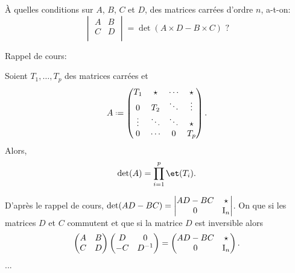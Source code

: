 \begin{exercice} 
À quelles conditions sur $A$, $B$, $C$ et $D$, des matrices carrées d'ordre $n$, a-t-on:
    $$
        \begin{vmatrix}
            A & B\\
            C & D\\
        \end{vmatrix} = \det(A \times D - B \times C) \text{ ?}
    $$ 
\end{exercice}
 
Rappel de cours:

\begin{prop}{}
    Soient $T_1, \dots, T_p$ des matrices carrées et 
    $$A \defeq
    \begin{pmatrix}
        T_1 & \star & \cdots & \star \\
        0 & T_2 & \ddots & \vdots \\
        \vdots & \ddots & \ddots & \star \\
        0 & \cdots & 0 & T_p
    \end{pmatrix}.
    $$
    Alors, 
    $$\det(A) = \prod_{i=1}^p \et(T_i).$$
\end{prop}

\begin{solution}
    D'après le rappel de cours, $\det(AD - BC) = \begin{vmatrix}
        AD - BC & \star \\
        0 & \mathrm{I}_n
    \end{vmatrix}$.  
    On  que si les matrices $D$ et $C$ commutent et que si la matrice $D$ est inversible alors
    $$
    \begin{pmatrix}
        A & B \\
        C & D
    \end{pmatrix}
    \begin{pmatrix}
        D & 0 \\
        -C & D^{-1}
    \end{pmatrix}
     = \begin{pmatrix}
         AD-BC & \star \\
         0 & \mathrm{I}_n
     \end{pmatrix}.
    $$
    ...
\end{solution}